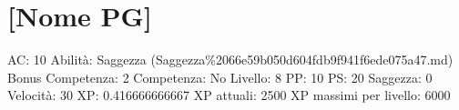 \section{{[}Nome PG{]}}\label{nome-pg}

AC: 10 Abilità: Saggezza
(Saggezza\%2066e59b050d604fdb9f941f6ede075a47.md) Bonus Competenza: 2
Competenza: No Livello: 8 PP: 10 PS: 20 Saggezza: 0 Velocità: 30 XP:
0.416666666667 XP attuali: 2500 XP massimi per livello: 6000
